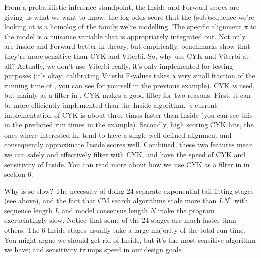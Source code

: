 From a probabilistic inference standpoint, the Inside and Forward
scores are giving us what we want to know, the log-odds score that the
(sub)sequence we're looking at is a homolog of the family we're
modelling. The specific alignment $\pi$ to the model is a nuisance
variable that is appropriately integrated out. Not only are Inside and
Forward better in theory, but empirically, benchmarks show that
they're more sensitive than CYK and Viterbi. So, why use CYK and
Viterbi at all?  Actually, we don't use Viterbi really, it's
only implemented for testing purposes (it's okay; calibrating Viterbi
E-values takes a very small fraction of the running time of
, you can see for yourself in the previous
example). CYK \emph{is} used, but mainly as a filter in
. CYK makes a good filter for two reasons. First, it can be
more efficiently implemented than the Inside
algorithm. 's current implementation of CYK is
about three times faster than Inside (you can see this in the
predicted run times in the  example). Secondly,
high scoring CYK hits, the ones where interested in, tend to have a
single well-defined alignment and consequently approximate Inside
scores well. Combined, these two features mean we can safely and
effectively filter with CYK, and have the speed of CYK and sensitivity
of Inside. You can read more about how we use CYK as a filter in
 in section 6.


\begin{srefaq}{Why is  so slow?} The
    necessity of doing 24 separate exponential tail fitting stages
    (see above), and the fact that CM search algorithms scale more
    than $LN^2$ with sequence length $L$ and model consensus length
    $N$ make the program excruciatingly slow. Notice that some of the
    24 stages are much faster than others. The 6 Inside stages usually
    take a large majority of the total run time. You might argue we
    should get rid of Inside, but it's the most sensitive algorithm we
    have; and sensitivity trumps speed in our design goals.
\end{srefaq}


